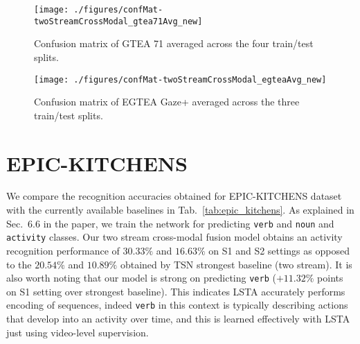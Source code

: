 \documentclass[10pt,twocolumn,letterpaper]{article}
\begin{document}
	\begin{figure*}[t]
		\centering
		\texttt{[image: ./figures/confMat-twoStreamCrossModal\_gtea71Avg\_new]}
		\caption{Confusion matrix of GTEA 71 averaged across the four train/test splits.}
		\label{fig:twoStream_crossmodal_gtea71_conf}
	\end{figure*}
	
	\begin{figure*}[t]
		\centering
		\texttt{[image: ./figures/confMat-twoStreamCrossModal\_egteaAvg\_new]}
		\caption{Confusion matrix of EGTEA Gaze+ averaged across the three train/test splits.}
		\label{fig:twoStream_crossmodal_egtea_conf}
	\end{figure*}
	
	
	\section{EPIC-KITCHENS}
	We compare the recognition accuracies obtained for EPIC-KITCHENS dataset with the currently available baselines \cite{Damen_2018_ECCV} in Tab.~\ref{tab:epic_kitchens}. As explained in Sec.~6.6 in the paper, we train the network for predicting \verb+verb+ and \verb+noun+ and \verb+activity+ classes. Our two stream cross-modal fusion model obtains an activity recognition performance of $30.33\%$ and $16.63\%$ on S1 and S2 settings as opposed to the $20.54\%$ and $10.89\%$ obtained by TSN strongest baseline (two stream). It is also worth noting that our model is strong on predicting \verb+verb+ ($+11.32\%$ points on S1 setting over strongest baseline). This indicates LSTA accurately performs encoding of sequences, indeed \verb+verb+ in this context is typically describing actions that develop into an activity over time, and this is learned effectively with LSTA just using video-level supervision.
\end{document}
